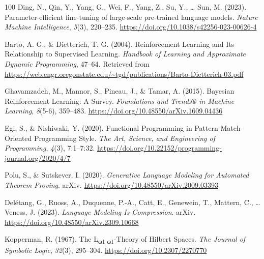 \documentclass[11pt]{book}
\begin{document}
\begin{thebibliography}{100}
 Ding, N., Qin, Y., Yang, G., Wei, F., Yang, Z., Su, Y., \ldots{} Sun, M.
(2023). Parameter-efficient fine-tuning of large-scale pre-trained
language models. \emph{Nature Machine Intelligence}, \emph{5}(3),
220--235. \url{https://doi.org/10.1038/s42256-023-00626-4}

 Barto, A. G., \& Dietterich, T. G. (2004). Reinforcement Learning and
Its Relationship to Supervised Learning. \emph{Handbook of Learning and
Approximate Dynamic Programming}, 47--64. Retrieved from
\url{https://web.engr.oregonstate.edu/~tgd/publications/Barto-Dietterich-03.pdf}

 Ghavamzadeh, M., Mannor, S., Pineau, J., \& Tamar, A. (2015). Bayesian
Reinforcement Learning: A Survey. \emph{Foundations and Trends® in
Machine Learning}, \emph{8}(5-6), 359--483.
\url{https://doi.org/10.48550/arXiv.1609.04436}

 Egi, S., \& Nishiwaki, Y. (2020). Functional Programming in
Pattern-Match-Oriented Programming Style. \emph{The Art, Science, and
Engineering of Programming}, \emph{4}(3), 7:1--7:32.
\url{https://doi.org/10.22152/programming-journal.org/2020/4/7}

 Polu, S., \& Sutskever, I. (2020). \emph{Generative Language Modeling
for Automated Theorem Proving}. arXiv.
\url{https://doi.org/10.48550/arXiv.2009.03393}

 Delétang, G., Ruoss, A., Duquenne, P.-A., Catt, E., Genewein, T.,
Mattern, C., \ldots{} Veness, J. (2023). \emph{Language Modeling Is
Compression}. arXiv. \url{https://doi.org/10.48550/arXiv.2309.10668}

 Kopperman, R. (1967). The L\textsubscript{ω1 ω1}-Theory of Hilbert
Spaces. \emph{The Journal of Symbolic Logic}, \emph{32}(3), 295--304.
\url{https://doi.org/10.2307/2270770}

\end{thebibliography}
\end{document}
